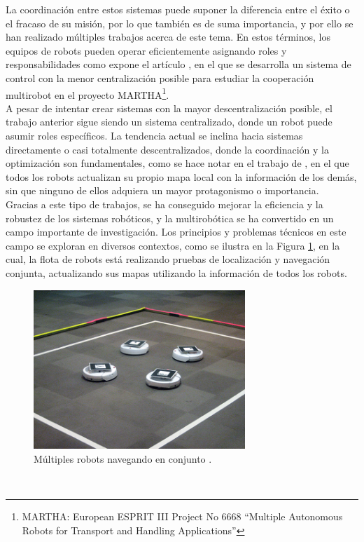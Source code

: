 La coordinación entre estos sistemas puede suponer la diferencia entre el éxito
o el fracaso de su misión, por lo que también es de suma importancia, y por ello
se han realizado múltiples trabajos acerca de este tema.
En estos términos, los equipos de robots pueden operar eficientemente asignando
roles y responsabilidades como expone el artículo \cite{Alami1998}, en el que se
desarrolla un sistema de control con la menor centralización posible para
estudiar la cooperación multirobot en el proyecto
MARTHA\footnote{MARTHA: European ESPRIT III Project No 6668 ``Multiple
Autonomous Robots for Transport and Handling Applications''}.
\\

A pesar de intentar crear sistemas con la mayor descentralización posible, el
trabajo anterior sigue siendo un sistema centralizado, donde un robot puede
asumir roles específicos.
La tendencia actual se inclina hacia sistemas directamente o casi totalmente
descentralizados, donde la coordinación y la optimización son fundamentales,
como se hace notar en el trabajo de \cite{Sheng2006}, en el que todos los robots
actualizan su propio mapa local con la información de los demás, sin que ninguno
de ellos adquiera un mayor protagonismo o importancia.
\\

Gracias a este tipo de trabajos, se ha conseguido mejorar la eficiencia y la
robustez de los sistemas robóticos, y la multirobótica se ha convertido en un
campo importante de investigación.
Los principios y problemas técnicos en este campo se exploran en diversos
contextos, como se ilustra en la Figura \ref{fig:multirobots}, en la cual, la
flota de robots está realizando pruebas de localización y navegación conjunta,
actualizando sus mapas utilizando la información de todos los robots.

\begin{figure} [h!]
  \begin{center}
    \includegraphics[width=8cm]{figs/multirobotics_navigation}
  \end{center}
  \caption{Múltiples robots navegando en conjunto \cite{multirobot_navigation}.}
  \label{fig:multirobots}
\end{figure}\


